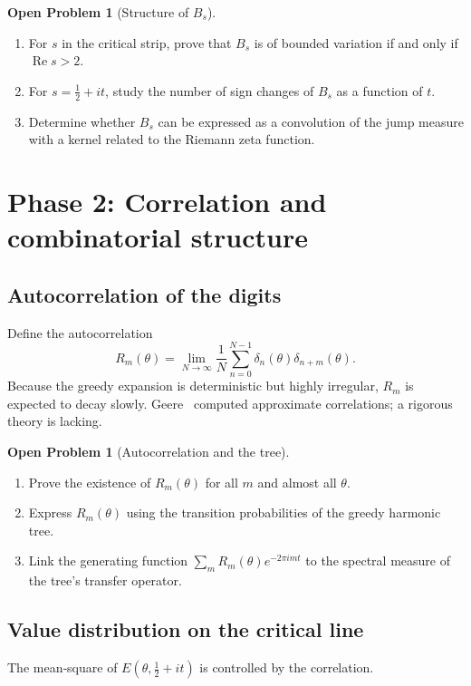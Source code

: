 \documentclass[11pt,a4paper]{article}
\theoremstyle{definition}
\newtheorem{problem}[theorem]{Open Problem}
\theoremstyle{remark}
\begin{document}
\begin{problem}[Structure of \(B_s\)]\label{prob:balance}
\begin{enumerate}[label=(\alph*)]
\item For \(s\) in the critical strip, prove that \(B_s\) is of bounded variation if and only if \(\operatorname{Re}s>2\).
\item For \(s=\frac12+it\), study the number of sign changes of \(B_s\) as a function of \(t\).
\item Determine whether \(B_s\) can be expressed as a convolution of the jump measure with a kernel related to the Riemann zeta function.
\end{enumerate}
\end{problem}

\section{Phase 2: Correlation and combinatorial structure}
\subsection{Autocorrelation of the digits}
Define the autocorrelation
\[
R_m(\theta)=\lim_{N\to\infty}\frac{1}{N}\sum_{n=0}^{N-1}\delta_n(\theta)\delta_{n+m}(\theta).
\]
Because the greedy expansion is deterministic but highly irregular, \(R_m\) is expected to decay slowly.
Geere~\cite{Geere2026a} computed approximate correlations; a rigorous theory is lacking.

\begin{problem}[Autocorrelation and the tree]\label{prob:corr}
\begin{enumerate}[label=(\alph*)]
\item Prove the existence of \(R_m(\theta)\) for all \(m\) and almost all \(\theta\).
\item Express \(R_m(\theta)\) using the transition probabilities of the greedy harmonic tree.
\item Link the generating function \(\sum_m R_m(\theta) e^{-2\pi i m t}\) to the spectral measure of the tree's transfer operator.
\end{enumerate}
\end{problem}

\subsection{Value distribution on the critical line}
The mean‑square of \(E(\theta,\frac12+it)\) is controlled by the correlation.
\end{document}
